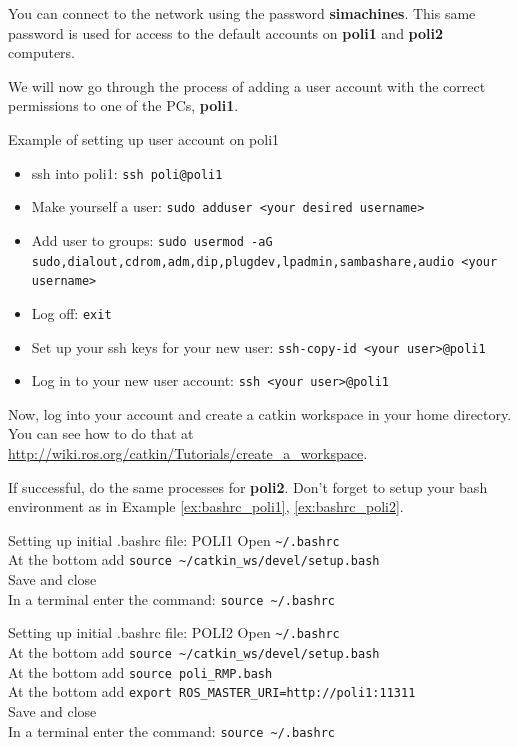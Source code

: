 You can connect to the network using the password \textbf{simachines}. 
This same password is used for access to the default accounts on \textbf{poli1} and \textbf{poli2} computers.

We will now go through the process of adding a user account with the correct permissions to one of the PCs, \textbf{poli1}.

\begin{example}{Example of setting up user account on poli1}
  \label{ex:user_accounts}
  \begin{itemize}
  	\item ssh into poli1: \texttt{ssh poli@poli1}
    \item Make yourself a user: \texttt{sudo adduser <your desired username>}
    \item Add user to groups: \texttt{sudo usermod -aG sudo,dialout,cdrom,adm,dip,plugdev,lpadmin,sambashare,audio <your username>}
	\item  Log off: \texttt{exit}
    \item Set up your ssh keys for your new user: \texttt{ssh-copy-id <your user>@poli1}
	\item Log in to your new user account: \texttt{ssh <your user>@poli1}
  \end{itemize}
\end{example}

Now, log into your account and create a catkin workspace in your home directory. You can see how to do that at \\
\href{http://wiki.ros.org/catkin/Tutorials/create_a_workspace}{http://wiki.ros.org/catkin/Tutorials/create\_a\_workspace}.

If successful, do the same processes for \textbf{poli2}. Don't forget to setup your bash environment as in Example \ref{ex:bashrc_poli1}, \ref{ex:bashrc_poli2}.\\

\begin{example}{Setting up initial .bashrc file: POLI1}
  \label{ex:bashrc_poli1}
    Open \texttt{\textasciitilde/.bashrc} \\
    At the bottom add \texttt{source \textasciitilde/catkin\_ws/devel/setup.bash} \\
    Save and close \\
    In a terminal enter the command: \texttt{source \textasciitilde/.bashrc}
\end{example}

\begin{example}{Setting up initial .bashrc file: POLI2}
  \label{ex:bashrc_poli2}
    Open \texttt{\textasciitilde/.bashrc} \\
    At the bottom add \texttt{source \textasciitilde/catkin\_ws/devel/setup.bash} \\
    At the bottom add \texttt{source poli\_RMP.bash} \\
    At the bottom add \texttt{export ROS\_MASTER\_URI=http://poli1:11311} \\
    Save and close \\
    In a terminal enter the command: \texttt{source \textasciitilde/.bashrc}
\end{example}

